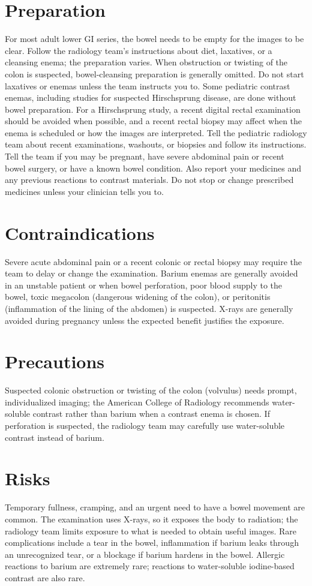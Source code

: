 \section*{Preparation}
For most adult lower GI series, the bowel needs to be empty for the images to be clear. Follow the radiology team's instructions about diet, laxatives, or a cleansing enema; the preparation varies. When obstruction or twisting of the colon is suspected, bowel-cleansing preparation is generally omitted. Do not start laxatives or enemas unless the team instructs you to. Some pediatric contrast enemas, including studies for suspected Hirschsprung disease, are done without bowel preparation. For a Hirschsprung study, a recent digital rectal examination should be avoided when possible, and a recent rectal biopsy may affect when the enema is scheduled or how the images are interpreted. Tell the pediatric radiology team about recent examinations, washouts, or biopsies and follow its instructions. Tell the team if you may be pregnant, have severe abdominal pain or recent bowel surgery, or have a known bowel condition. Also report your medicines and any previous reactions to contrast materials. Do not stop or change prescribed medicines unless your clinician tells you to.

\section*{Contraindications}
Severe acute abdominal pain or a recent colonic or rectal biopsy may require the team to delay or change the examination. Barium enemas are generally avoided in an unstable patient or when bowel perforation, poor blood supply to the bowel, toxic megacolon (dangerous widening of the colon), or peritonitis (inflammation of the lining of the abdomen) is suspected. X-rays are generally avoided during pregnancy unless the expected benefit justifies the exposure.

\section*{Precautions}
Suspected colonic obstruction or twisting of the colon (volvulus) needs prompt, individualized imaging; the American College of Radiology recommends water-soluble contrast rather than barium when a contrast enema is chosen. If perforation is suspected, the radiology team may carefully use water-soluble contrast instead of barium.

\section*{Risks}
Temporary fullness, cramping, and an urgent need to have a bowel movement are common. The examination uses X-rays, so it exposes the body to radiation; the radiology team limits exposure to what is needed to obtain useful images. Rare complications include a tear in the bowel, inflammation if barium leaks through an unrecognized tear, or a blockage if barium hardens in the bowel. Allergic reactions to barium are extremely rare; reactions to water-soluble iodine-based contrast are also rare.

